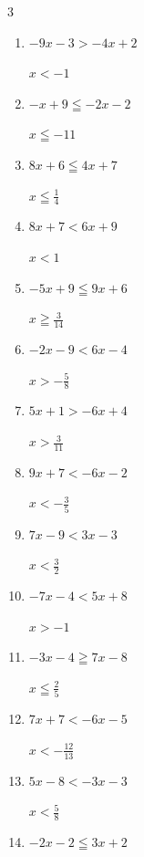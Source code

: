\begin{multicols}{3}
\begin{enumerate}
        $\displaystyle x<-\frac{3}{17}$

  \item $-9x-3>-4x+2$

        $\displaystyle x<-1$

  \item $-x+9\leqq -2x-2$

        $\displaystyle x\leqq -11$

  \item $8x+6\leqq 4x+7$

        $\displaystyle x\leqq \frac{1}{4}$

  \item $8x+7<6x+9$

        $\displaystyle x<1$

  \item $-5x+9\leqq 9x+6$

        $\displaystyle x\geqq \frac{3}{14}$

  \item $-2x-9<6x-4$

        $\displaystyle x>-\frac{5}{8}$

  \item $5x+1>-6x+4$

        $\displaystyle x>\frac{3}{11}$

  \item $9x+7<-6x-2$

        $\displaystyle x<-\frac{3}{5}$

  \item $7x-9<3x-3$

        $\displaystyle x<\frac{3}{2}$

  \item $-7x-4<5x+8$

        $\displaystyle x>-1$

  \item $-3x-4\geqq 7x-8$

        $\displaystyle x\leqq \frac{2}{5}$

  \item $7x+7<-6x-5$

        $\displaystyle x<-\frac{12}{13}$

  \item $5x-8<-3x-3$

        $\displaystyle x<\frac{5}{8}$

\columnbreak %

  \item $-2x-2\leqq 3x+2$


\end{enumerate}
\end{multicols}
